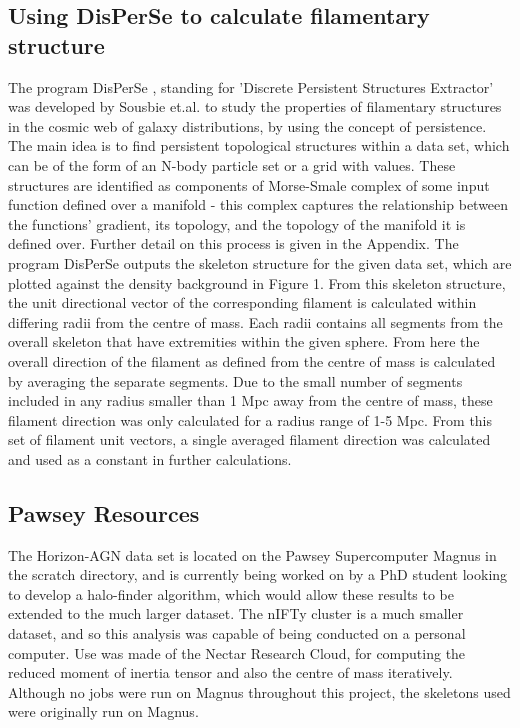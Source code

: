 \documentclass[journal]{IEEEtran}
\begin{document}
\subsection{Using DisPerSe to calculate filamentary structure}
The program DisPerSe \cite{sousbie11a}, standing for 'Discrete Persistent Structures Extractor' was developed by Sousbie et.al. to study the properties of filamentary structures in the cosmic web of galaxy distributions, by using the concept of persistence. The main idea is to find persistent topological structures within a data set, which can be of the form of an N-body particle set or a grid with values. These structures are identified as components of Morse-Smale complex of some input function defined over a manifold - this complex captures the relationship between the functions' gradient, its topology, and the topology of the manifold it is defined over. Further detail on this process is given in the Appendix.
The program DisPerSe outputs the skeleton structure for the given data set, which are plotted against the density background in Figure 1. From this skeleton structure, the unit directional vector of the corresponding filament is calculated within differing radii from the centre of mass. Each radii contains all segments from the overall skeleton that have extremities within the given sphere. From here the overall direction of the filament as defined from the centre of mass is calculated by averaging the separate segments. Due to the small number of segments included in any radius smaller than 1 Mpc away from the centre of mass, these filament direction was only calculated for a radius range of 1-5 Mpc. From this set of filament unit vectors, a single averaged filament direction was calculated and used as a constant in further calculations.

\subsection{Pawsey Resources}
The Horizon-AGN data set is located on the Pawsey Supercomputer Magnus in the scratch directory, and is currently being worked on by a PhD student looking to develop a halo-finder algorithm, which would allow these results to be extended to the much larger dataset. The nIFTy cluster is a much smaller dataset, and so this analysis was capable of being conducted on a personal computer. Use was made of the Nectar Research Cloud, for computing the reduced moment of inertia tensor and also the centre of mass iteratively. Although no jobs were run on Magnus throughout this project, the skeletons used were originally run on Magnus. 
\end{document}
